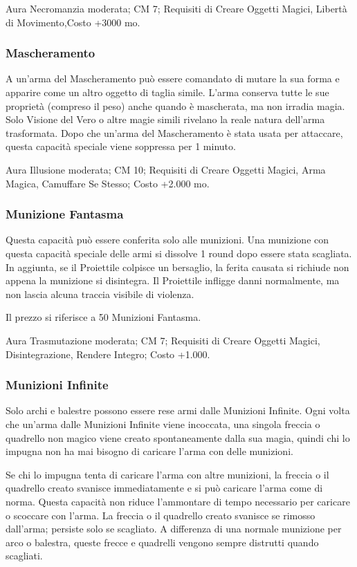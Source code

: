 \begin{multicols}{2}
Aura Necromanzia moderata; CM 7; Requisiti di Creare Oggetti Magici, Libertà di Movimento,Costo +3000 mo.

\subsubsection{Mascheramento}

A un'arma del Mascheramento può essere comandato di mutare la sua forma e apparire come un altro oggetto di taglia simile. L'arma conserva tutte le sue proprietà (compreso il peso) anche quando è mascherata, ma non irradia magia. Solo Visione del Vero o altre magie simili rivelano la reale natura dell'arma trasformata. Dopo che un'arma del Mascheramento è stata usata per attaccare, questa capacità speciale viene soppressa per 1 minuto.

Aura Illusione moderata; CM 10; Requisiti di Creare Oggetti Magici, Arma Magica, Camuffare Se Stesso; Costo +2.000 mo.

\subsubsection{Munizione Fantasma}

Questa capacità può essere conferita solo alle munizioni. Una munizione con questa capacità speciale delle armi si dissolve 1 round dopo essere stata scagliata. In aggiunta, se il Proiettile colpisce un bersaglio, la ferita causata si richiude non appena la munizione si disintegra. Il Proiettile infligge danni normalmente, ma non lascia alcuna traccia visibile di violenza.

Il prezzo si riferisce a 50 Munizioni Fantasma.

Aura Trasmutazione moderata; CM 7; Requisiti di Creare Oggetti Magici, Disintegrazione, Rendere Integro; Costo +1.000.

\subsubsection{Munizioni Infinite}

Solo archi e balestre possono essere rese armi dalle Munizioni Infinite. Ogni volta che un'arma dalle Munizioni Infinite viene incoccata, una singola freccia o quadrello non magico viene creato spontaneamente dalla sua magia, quindi chi lo impugna non ha mai bisogno di caricare l'arma con delle munizioni.

Se chi lo impugna tenta di caricare l'arma con altre munizioni, la freccia o il quadrello creato svanisce immediatamente e si può caricare l'arma come di norma. Questa capacità non riduce l'ammontare di tempo necessario per caricare o scoccare con l'arma. La freccia o il quadrello creato svanisce se rimosso dall'arma; persiste solo se scagliato. A differenza di una normale munizione per arco o balestra, queste frecce e quadrelli vengono sempre distrutti quando scagliati.


\end{multicols}
